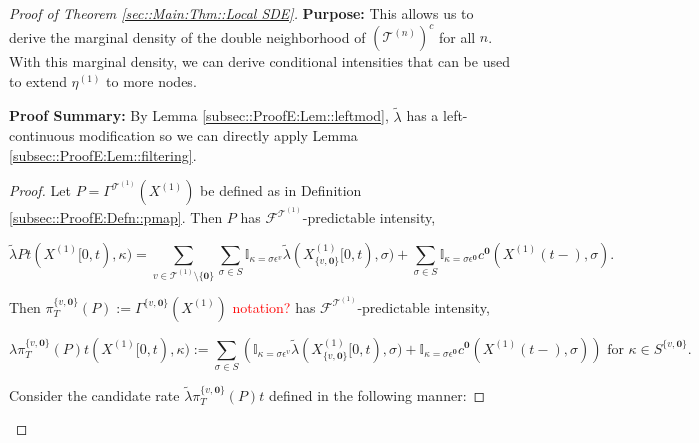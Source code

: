 \documentclass[12pt]{article}
\newcommand{\mb}{\mathbb}
\newcommand{\mc}{\mathcal}
\newcommand{\te}{\text}
\newcommand{\ep}{\epsilon}
\newcommand{\tr}{\textcolor{red}}
\newcommand{\purpose}{\textbf{Purpose: }}
\newcommand{\pfsum}{\textbf{Proof Summary: }}
\newcommand{\defeq}{:=}								%
\renewcommand{\root}{\mathbf{0}}				%
\renewcommand{\v}{v}							%
\renewcommand{\S}{S}							%
\newcommand{\s}{\sigma}							%
\newcommand{\ev}{\ep}							%
\newcommand{\T}{T}								%
\renewcommand{\t}{t}							%
\newcommand{\proj}{\pi}							%
\newcommand{\F}{\mc{F}}							%
\newcommand{\X}{X}								%
\newcommand{\IGr}{c}							%
\newcommand{\vind}[1]{^{#1}}					%
\newcommand{\carp}[1]{^{#1}}					%
\newcommand{\vsi}[1]{^{#1}}						%
\newcommand{\cind}[1]{_{#1}}					%
\newcommand{\tp}[1]{(#1)}						%
\newcommand{\tip}[1]{#1}						%
\newcommand{\ts}[1]{_{#1}}						%
\newcommand{\tree}{\mc{T}}						%
\newcommand{\sln}[1]{^{(#1)}}					%
\newcommand{\rate}{\lambda}						%
\newcommand{\alt}[1]{\widetilde{#1}}			%
\newcommand{\mmm}{\eta}							%
\newcommand{\pmap}{\Gamma}						%
\renewcommand{\mark}{\kappa}					%
\newcommand{\rp}{P}								%
\newcommand{\crate}{\alt{\lambda}}				%
\begin{document}
\begin{proof}[Proof of Theorem \ref{sec::Main:Thm::Local SDE}]
\purpose This allows us to derive the marginal density of the double neighborhood of \((\tree\sln{n})^c\) for all \(n\). With this marginal density, we can derive conditional intensities that can be used to extend \(\mmm\sln{1}\ts{}\) to more nodes.

\pfsum By Lemma \ref{subsec::ProofE:Lem::leftmod}, \(\crate{}{}\) has a left-continuous modification so we can directly apply Lemma \ref{subsec::ProofE:Lem::filtering}.

\begin{proof}
Let \(\rp{} = \pmap\vind{\tree\sln{1}}(\X\sln{1}\cind{}\tip{})\) be defined as in Definition \ref{subsec::ProofE:Defn::pmap}. Then \(\rp{}\) has \(\F\vsi{\tree\sln{1}}\ts{}\)-predictable intensity,

\[\crate{\rp{}}{\t}(\X\sln{1}\cind{}\tip{[0,\t)},\mark{}) = \sum_{\v\in \tree\sln{1}\setminus\{\root\}}\sum_{\s\in \S} \mb{I}_{\mark{} = \s\ev\vind{\v}}\crate{}{}(\X\sln{1}\cind{\{\v,\root\}}\tip{[0,\t)},\s) + \sum_{\s\in\S}\mb{I}_{\mark{} = \s\ev\vind{\root}}\IGr\vind{\root}(\X\sln{1}\cind{}\tp{\t-},\s).\]

Then \(\proj\vsi{\{\v,\root\}}\ts{\T}(\rp{})\defeq \pmap\vind{\{\v,\root\}}(\X\sln{1}\cind{}\tip{})\) \tr{notation?} has \(\F\vsi{\tree\sln{1}}\ts{}\)-predictable intensity,

\[\rate{\proj\vsi{\{\v,\root\}}\ts{\T}(\rp{})}{\t}(\X\sln{1}\cind{}\tip{[0,\t)},\mark{}) \defeq \sum_{\s\in \S} \left(\mb{I}_{\mark{} = \s\ev\vind{\v}}\crate{}{}(\X\sln{1}\cind{\{\v,\root\}}\tip{[0,\t)},\s) + \mb{I}_{\mark{} = \s\ev\vind{\root}}\IGr\vind{\root}(\X\sln{1}\cind{}\tp{\t-},\s)\right)\te{ for } \kappa \in \S\carp{\{\v,\root\}}.\]

Consider the candidate rate \(\crate{\proj\vsi{\{\v,\root\}}\ts{\T}(\rp{})}{\t}\) defined in the following manner:


\end{proof}
\end{proof}
\end{document}
